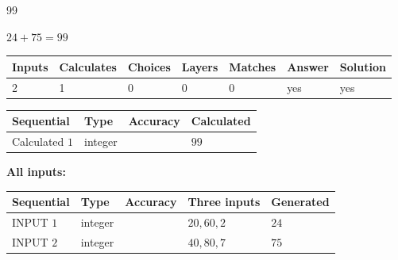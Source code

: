\documentclass[12pt]{article}
\begin{document}
\noindent{}
 
 

99
 
 
\noindent{}
 
 

 
 
 
\noindent{}
 
 

$ %
24 +  %
75=   %
99$
 
 
\noindent{}
 
 

 
   
   
   
   
\noindent\begin{tabular}{|l|l|l|l|l|l|l|}
 \hline
Inputs & Calculates & Choices & Layers & Matches & Answer & Solution \\ \hline
 2  & 
 1  & 
 0
  & 
 0  & 
 0  & 
  yes & 
  yes 
  \\ \hline
 \end{tabular}
   
   
   
   
\noindent{}
   
   
  
  
\noindent\begin{tabular}{|l|l|l|l|}
\hline
 Sequential & Type & Accuracy & Calculated \\ 
\hline
 
 
  Calculated $  1 $ & integer &  & 
  $ 99 $ 
 \\  \hline  
 \end{tabular}
   
   
   
   
\noindent\vspace{0.1in}\hspace{-0.08in} {\textbf{\Large{All inputs: }}}
   
   
  
  
\noindent\begin{tabular}{|l|l|l|l|l|}
\hline
 Sequential & Type & Accuracy & Three inputs & Generated \\ 
\hline
 
 
  INPUT $  1 $ & integer &  & $
 20
 , 
 60
 , 
 2
 $ & $ 24 $ 
 \\  \hline  
 
 
  INPUT $  2 $ & integer &  & $
 40
 , 
 80
 , 
 7
 $ & $ 75 $ 
 \\  \hline  
 \end{tabular}
   
\end{document}
